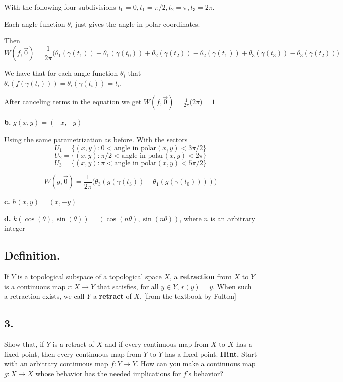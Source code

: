 \documentclass{amsart}
\theoremstyle{plain}
\theoremstyle{definition}
\theoremstyle{remark}
\begin{document}
With the following four subdivisions $t_0= 0,t_1=\pi/2,t_2=\pi,t_3=2\pi$. 

Each angle function $\theta_i$ just gives the angle in polar coordinates.

Then 
\[
    W(f,\vec 0)=\frac{1}{2\pi}\big(\theta_1(\gamma (t_1))- \theta_1 (\gamma(t_0))+\theta_2(\gamma(t_2))-\theta_2(\gamma(t_1))+\theta_3(\gamma(t_3))-\theta_3(\gamma(t_2))\big)
\]

We have that for each angle function $\theta_i$ that $\theta_i(f(\gamma(t_i)))=\theta_i(\gamma(t_i))=t_i$.

After canceling terms in the equation we get $W(f,\vec 0)=\frac{1}{2\pi}\big(2\pi \big)=1$


\vspace{.1in}
{\bfseries b.} $g(x,y) = (-x,-y)$

{ 
    Using the same parametrization as before. With the sectors $$U_1=\{(x,y): 0< \text{angle in polar}(x,y)<3\pi/2\}$$  
    $$
    U_2=\{(x,y): \pi/2 < \text{angle in polar}(x,y)<2\pi\}
    $$
    $$
    U_3=\{(x,y): \pi < \text{angle in polar}(x,y)< 5\pi/2\}
    $$


    \[
    W(g,\vec 0)=\frac{1}{2\pi}\big(\theta_3(g(\gamma (t_3))-\theta_1(g(\gamma(t_0))))\big)
    \]


}

\vspace{.1in}
{\bfseries c.} $h(x,y) = (x,-y)$

\vspace{.1in}
{\bfseries d.} $k(\cos (\theta ), \sin (\theta )) = (\cos (n\theta ), \sin (n\theta ))$, where $n$ is an arbitrary integer


\vspace{.15in}
\subsection*{Definition.}  If $Y$ is a topological subspace of a topological space $X$, a {\bf retraction} from $X$ to $Y$ is a continuous map $r : X \to Y$ that satisfies, for all $y\in Y$, $r(y) = y$. When such a retraction exists, we call $Y$ a {\bf retract} of $X$. [from the textbook by Fulton]

\vspace{.15in}
\noindent
\subsection*{3.} Show that, if $Y$ is a retract of $X$ and if every continuous map from $X$ to $X$ has a fixed point, then every continuous map from $Y$ to $Y$ has a fixed point. {\bf Hint.} Start with an arbitrary continuous map $f : Y\to Y$. How can you make a continuous map $g : X\to X$ whose behavior has the needed implications for $f$'s behavior?
 
\end{document}
